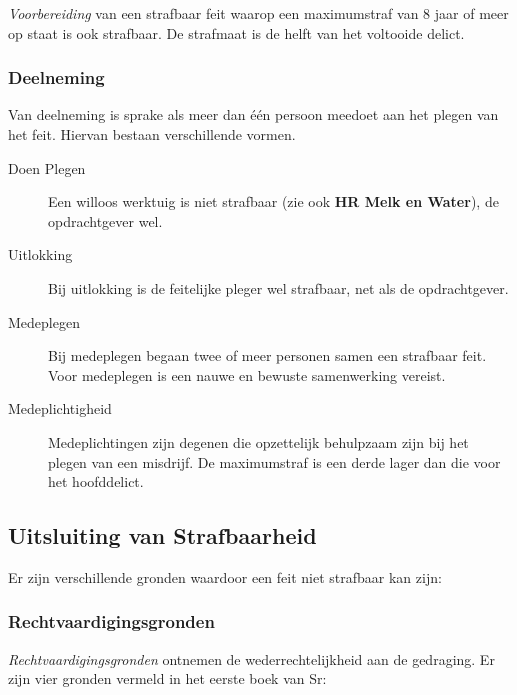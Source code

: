 \documentclass{article}
\begin{document}
\emph{Voorbereiding} van een strafbaar feit waarop een maximumstraf van 8 jaar
of meer op staat is ook strafbaar. De strafmaat is de helft van het voltooide
delict.

\subsubsection{Deelneming}

Van deelneming is sprake als meer dan \'e\'en persoon meedoet aan het plegen
van het feit. Hiervan bestaan verschillende vormen.

\begin{description}

  \item[Doen Plegen] Een willoos werktuig is niet strafbaar (zie ook \textbf{HR
    Melk en Water}), de opdrachtgever wel.

  \item[Uitlokking] Bij uitlokking is de feitelijke pleger wel strafbaar, net
    als de opdrachtgever.

  \item[Medeplegen] Bij medeplegen begaan twee of meer personen samen een
    strafbaar feit. Voor medeplegen is een nauwe en bewuste samenwerking
    vereist.

  \item[Medeplichtigheid] Medeplichtingen zijn degenen die opzettelijk
    behulpzaam zijn bij het plegen van een misdrijf. De maximumstraf is een
    derde lager dan die voor het hoofddelict.

\end{description}

\subsection{Uitsluiting van Strafbaarheid}

Er zijn verschillende gronden waardoor een feit niet strafbaar kan zijn:

\subsubsection{Rechtvaardigingsgronden}

\emph{Rechtvaardigingsgronden} ontnemen de wederrechtelijkheid aan de
gedraging. Er zijn vier gronden vermeld in het eerste boek van Sr:
\end{document}
